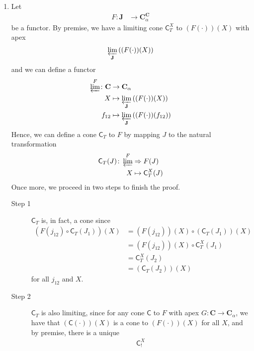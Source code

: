 \begin{prf}
\begin{enumerate}
\item[(1T)]
Let
\begin{align*}
  F
  \colon
  \mathbf{J}
  &\rightarrow
  \mathbf{C}_{\alpha}^{\mathbf{C}}
\end{align*}
be a functor.
By premise, we have a limiting cone $\mathsf{C}_{T}^{X}$ to $(F(\cdot))(X)$ with apex
\begin{align*}
  \varprojlim_{\mathbf{J}}
  \left(
    (F(\cdot))(X)
  \right)
\end{align*}
and we can define a functor
\begin{align*}
  \varprojlim^{F}
  \colon
  \mathbf{C}
  &\rightarrow
  \mathbf{C}_{\alpha}
  \\
  X
  &\mapsto
  \varprojlim_{\mathbf{J}}
  \left(
    (F(\cdot))(X)
  \right)
  \\
  f_{12}
  &\mapsto
  \varprojlim_{\mathbf{J}}
  \left(
    (F(\cdot))(f_{12})
  \right)
\end{align*}
Hence, we can define a cone $\mathsf{C}_{T}$ to $F$ by mapping $J$ to the natural transformation
\begin{align*}
  \mathsf{C}_{T}(J)
  \colon
  \varprojlim^{F}
  &\Rightarrow
  F(J)
  \\
  X
  &\mapsto
  \mathsf{C}_{T}^{X}(J)
\end{align*}
Once more, we proceed in two steps to finish the proof.
\begin{description}
\item[Step 1]
$\mathsf{C}_{T}$ is, in fact, a cone since
\begin{align*}
  \left(
    F(j_{12})
    \circ
    \mathsf{C}_{T}(J_{1})
  \right)
  (X)
  &=
  (F(j_{12}))(X)
  \circ
  \left(
    \mathsf{C}_{T}(J_{1})
  \right)
  (X)
  \\
  &=
  (F(j_{12}))(X)
  \circ
  \mathsf{C}_{T}^{X}(J_{1})
  \\
  &=
  \mathsf{C}_{T}^{X}(J_{2})
  \\
  &=
  \left(
    \mathsf{C}_{T}(J_{2})
  \right)
  (X)
\end{align*}
for all $j_{12}$ and $X$.
\item[Step 2]
$\mathsf{C}_{T}$ is also limiting, since for any cone $\mathsf{C}$ to $F$ with apex $G \colon \mathbf{C} \rightarrow \mathbf{C}_{\alpha}$, we have that $(\mathsf{C}(\cdot))(X)$ is a cone to $(F(\cdot))(X)$ for all $X$, and by premise, there is a unique
\begin{align*}
  \mathsf{C}_{!}^{X}

\end{align*}
\end{description}
\end{enumerate}
\end{prf}
